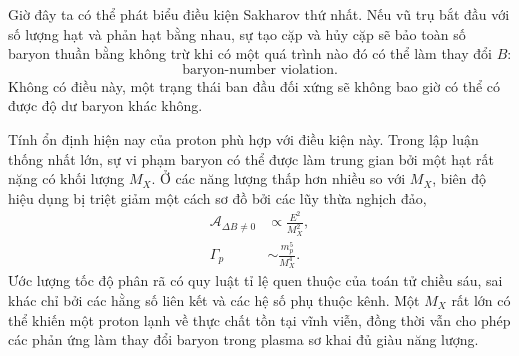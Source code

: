 \begin{classroomqa}
\end{classroomqa}

Giờ đây ta có thể phát biểu điều kiện Sakharov thứ nhất. Nếu vũ trụ bắt đầu với số lượng hạt và phản hạt bằng nhau, sự tạo cặp và hủy cặp sẽ bảo toàn số baryon thuần bằng không trừ khi có một quá trình nào đó có thể làm thay đổi \(B\):
\begin{equation}
\boxed{\text{baryon-number violation}.}
\end{equation}
Không có điều này, một trạng thái ban đầu đối xứng sẽ không bao giờ có thể có được độ dư baryon khác không.

Tính ổn định hiện nay của proton phù hợp với điều kiện này. Trong lập luận thống nhất lớn, sự vi phạm baryon có thể được làm trung gian bởi một hạt rất nặng có khối lượng \(M_X\). Ở các năng lượng thấp hơn nhiều so với \(M_X\), biên độ hiệu dụng bị triệt giảm một cách sơ đồ bởi các lũy thừa nghịch đảo,
\begin{equation}
\begin{aligned}
\mathcal A_{\Delta B\ne0}&\propto \frac{E^2}{M_X^2},\\
\Gamma_p&\sim \frac{m_p^5}{M_X^4}.
\end{aligned}
\label{eq:c08-heavy-suppression}
\end{equation}
Ước lượng tốc độ phân rã có quy luật tỉ lệ quen thuộc của toán tử chiều sáu, sai khác chỉ bởi các hằng số liên kết và các hệ số phụ thuộc kênh. Một \(M_X\) rất lớn có thể khiến một proton lạnh về thực chất tồn tại vĩnh viễn, đồng thời vẫn cho phép các phản ứng làm thay đổi baryon trong plasma sơ khai đủ giàu năng lượng.

\begin{classroomqa}
\end{classroomqa}

